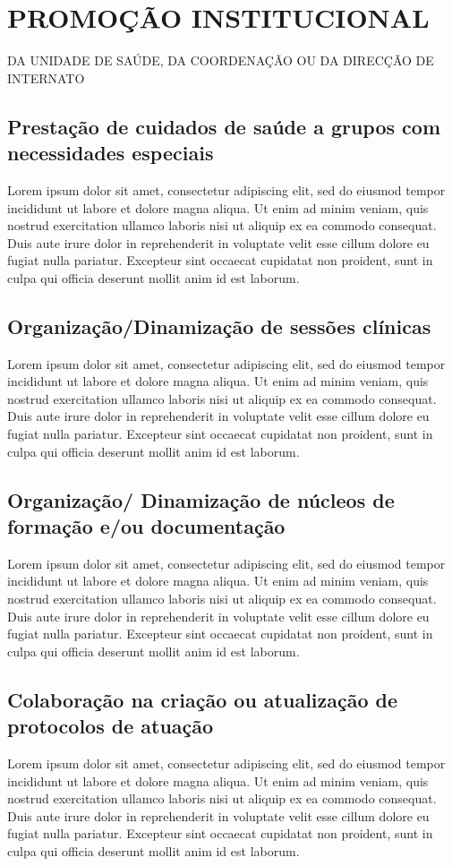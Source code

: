 \documentclass{report}
\begin{document}
\section{PROMOÇÃO INSTITUCIONAL}
DA UNIDADE DE SAÚDE, DA COORDENAÇÃO OU DA DIRECÇÃO DE INTERNATO

\subsection{Prestação de cuidados de saúde a grupos com necessidades especiais}
Lorem ipsum dolor sit amet, consectetur adipiscing elit, sed do eiusmod tempor incididunt ut labore et dolore magna aliqua. Ut enim ad minim veniam, quis nostrud exercitation ullamco laboris nisi ut aliquip ex ea commodo consequat. Duis aute irure dolor in reprehenderit in voluptate velit esse cillum dolore eu fugiat nulla pariatur. Excepteur sint occaecat cupidatat non proident, sunt in culpa qui officia deserunt mollit anim id est laborum.
\subsection{Organização/Dinamização de sessões clínicas}
Lorem ipsum dolor sit amet, consectetur adipiscing elit, sed do eiusmod tempor incididunt ut labore et dolore magna aliqua. Ut enim ad minim veniam, quis nostrud exercitation ullamco laboris nisi ut aliquip ex ea commodo consequat. Duis aute irure dolor in reprehenderit in voluptate velit esse cillum dolore eu fugiat nulla pariatur. Excepteur sint occaecat cupidatat non proident, sunt in culpa qui officia deserunt mollit anim id est laborum.
\subsection{Organização/ Dinamização de núcleos de formação e/ou documentação}
Lorem ipsum dolor sit amet, consectetur adipiscing elit, sed do eiusmod tempor incididunt ut labore et dolore magna aliqua. Ut enim ad minim veniam, quis nostrud exercitation ullamco laboris nisi ut aliquip ex ea commodo consequat. Duis aute irure dolor in reprehenderit in voluptate velit esse cillum dolore eu fugiat nulla pariatur. Excepteur sint occaecat cupidatat non proident, sunt in culpa qui officia deserunt mollit anim id est laborum.
\subsection{Colaboração na criação ou atualização de protocolos de atuação}
Lorem ipsum dolor sit amet, consectetur adipiscing elit, sed do eiusmod tempor incididunt ut labore et dolore magna aliqua. Ut enim ad minim veniam, quis nostrud exercitation ullamco laboris nisi ut aliquip ex ea commodo consequat. Duis aute irure dolor in reprehenderit in voluptate velit esse cillum dolore eu fugiat nulla pariatur. Excepteur sint occaecat cupidatat non proident, sunt in culpa qui officia deserunt mollit anim id est laborum.
\end{document}

